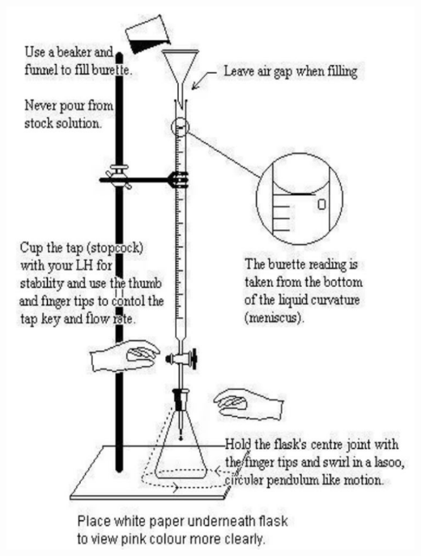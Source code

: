 \documentclass{article}
\begin{document}
\begin{minipage}[t]{\textwidth}
\begin{minipage}[t]{0.36\textwidth}
        \includegraphics[width=\textwidth]{media/titration_steps.png}
        \label{fig:titration_procedure}
    \end{minipage}
    \hfill
    \begin{minipage}[t]{0.28\textwidth}
        \centering

\end{minipage}
\end{minipage}
\end{document}
